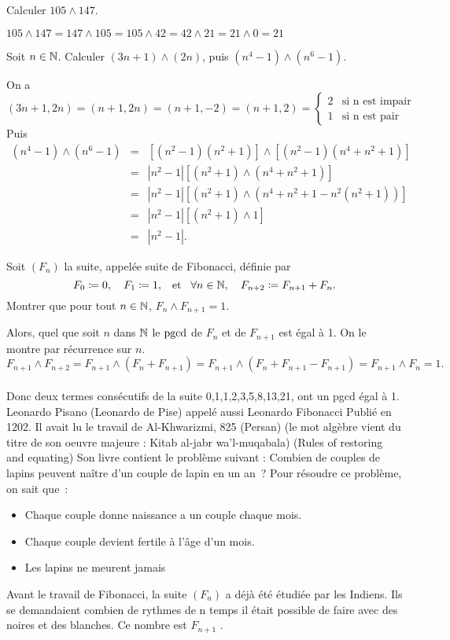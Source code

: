 \documentclass{magnolia}
\begin{document}
\begin{exos}
\exo Calculer $105\wedge 147$.
  \begin{sol}
  $105\wedge 147=147\wedge 105=105\wedge42=42\wedge21=21\wedge0=21$
  \end{sol}
\exo Soit $n\in\mathbb{N}$. Calculer $(3n+1)\wedge(2n)$, puis
  $(n^4-1)\wedge(n^6-1)$.
  \begin{sol}
  On a
  \[(3n+1,2n)=(n+1,2n)=(n+1,-2)=(n+1,2)=
    \begin{cases}
    2 &\text{si n est impair}\\
    1 &\text{si n est pair}
    \end{cases}\]
  Puis
  \begin{eqnarray*}
  (n^4-1)\wedge(n^6-1)&=&\left[(n^2-1)(n^2+1)\right]\wedge \left[(n^2-1)(n^4+n^2+1)\right]\\
  &=&|n^2-1|\left[(n^2+1)\wedge (n^4+n^2+1)\right]\\
  &=&|n^2-1|\left[(n^2+1)\wedge (n^4+n^2+1-n^2(n^2+1))\right]\\
  &=&|n^2-1|\left[(n^2+1)\wedge 1\right]\\
  &=&|n^2-1|.
  \end{eqnarray*} 
  \end{sol}
\exo Soit $(F_n)$ la suite, appelée suite de Fibonacci, définie par
  \[F_0\coloneqq 0, \quad F_1\coloneqq 1, \quad\!\text{et}\quad\! \forall n\in\mathbb{N} ,\quad F_{n+2}\coloneqq F_{n+1}+F_n.\]
  Montrer que pour tout $n\in\mathbb{N}$, $F_n\wedge F_{n+1}=1$.
  \begin{sol}
  Alors, quel que soit $n$ dans $\mathbb{N}$ le $\operatorname{pgcd}$ de $F_n$ et de $F_{n+1}$ est
  égal à 1. On le montre par récurrence sur $n$.
  $$F_{n+1}\wedge F_{n+2}=F_{n+1}\wedge (F_{n}+F_{n+1})=F_{n+1}\wedge (F_{n}+F_{n+1}-F_{n+1})=F_{n+1}\wedge F_{n}=1.$$\\
  Donc deux termes consécutifs de la suite 0,1,1,2,3,5,8,13,21, ont un pgcd
  égal à 1.\\
  Leonardo Pisano (Leonardo de Pise) appelé aussi Leonardo Fibonacci
  Publié en 1202. Il avait lu le travail de Al-Khwarizmi, 825 (Persan)
  (le mot \og algèbre \fg vient du titre de son oeuvre majeure : Kitab al-jabr
  wa'l-muqabala) (Rules of restoring and equating)
  Son livre contient le problème suivant : Combien de couples de lapins
  peuvent naître d'un couple de lapin en un an~? Pour résoudre ce problème, on
  sait que~:
  \begin{itemize}
  \item Chaque couple donne naissance a un couple chaque mois.
  \item Chaque couple devient fertile à l'âge d'un mois.
  \item Les lapins ne meurent jamais
  \end{itemize}
  Avant le travail de Fibonacci, la suite $(F_n)$ a déjà été étudiée par les
  Indiens. Ils se demandaient combien de rythmes de n temps il était possible
  de faire avec des noires et des blanches. Ce nombre est $F_{n+1}$ .   
  \end{sol}
\end{exos}
\end{document}
